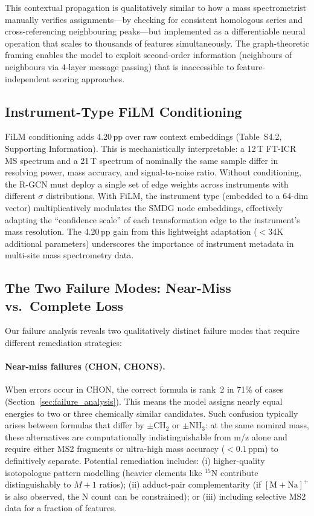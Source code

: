 \documentclass[journal=jcisd8]{achemso}
\begin{document}
This contextual propagation is qualitatively similar to how a mass spectrometrist manually
verifies assignments---by checking for consistent homologous series and cross-referencing
neighbouring peaks---but implemented as a differentiable neural operation that scales
to thousands of features simultaneously.  The graph-theoretic framing enables the model
to exploit second-order information (neighbours of neighbours via 4-layer message passing)
that is inaccessible to feature-independent scoring approaches.

\subsection{Instrument-Type FiLM Conditioning}

FiLM conditioning adds 4.20\,pp over raw context embeddings
(Table~S4.2, Supporting Information).  This is mechanistically interpretable: a 12\,T FT-ICR MS
spectrum and a 21\,T spectrum of nominally the same sample differ in resolving power,
mass accuracy, and signal-to-noise ratio.  Without conditioning, the R-GCN must deploy a
single set of edge weights across instruments with different $\sigma$ distributions.
With FiLM, the instrument type (embedded to a 64-dim vector) multiplicatively modulates
the SMDG node embeddings, effectively adapting the ``confidence scale'' of each
transformation edge to the instrument's mass resolution.  The 4.20\,pp gain from
this lightweight adaptation ($<$34K additional parameters) underscores the importance
of instrument metadata in multi-site mass spectrometry data.

\subsection{The Two Failure Modes: Near-Miss vs.\ Complete Loss}

Our failure analysis reveals two qualitatively distinct failure modes that require
different remediation strategies:

\paragraph{Near-miss failures (CHON, CHONS).}
When errors occur in CHON, the correct formula is rank~2 in 71\% of cases (Section~\ref{sec:failure_analysis}).
This means the model assigns nearly equal energies to two or three chemically similar
candidates.  Such confusion typically arises between formulas that differ by
$\pm\text{CH}_2$ or $\pm\text{NH}_3$: at the same nominal mass, these alternatives
are computationally indistinguishable from m/z alone and require either MS2 fragments
or ultra-high mass accuracy ($<0.1$\,ppm) to definitively separate.
Potential remediation includes: (i) higher-quality isotopologue pattern
modelling (heavier elements like $^{15}$N contribute distinguishably to $M+1$
ratios); (ii) adduct-pair complementarity (if $[\text{M}+\text{Na}]^+$ is also
observed, the N count can be constrained); or (iii) including selective MS2
data for a fraction of features.
\end{document}
